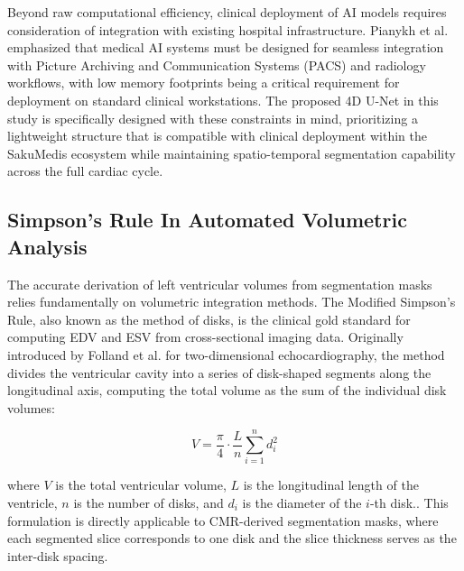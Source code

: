 \documentclass[final,3p,times,twocolumn]{elsarticle}
\begin{document}
Beyond raw computational efficiency, clinical deployment of AI models requires consideration of integration with existing hospital infrastructure. Pianykh et al. \cite{b26} emphasized that medical AI systems must be designed for seamless integration with Picture Archiving and Communication Systems (PACS) and radiology workflows, with low memory footprints being a critical requirement for deployment on standard clinical workstations. The proposed 4D U-Net in this study is specifically designed with these constraints in mind, prioritizing a lightweight structure that is compatible with clinical deployment within the SakuMedis ecosystem while maintaining spatio-temporal segmentation capability across the full cardiac cycle.

\subsection{Simpson's Rule In Automated Volumetric Analysis}
The accurate derivation of left ventricular volumes from segmentation masks relies fundamentally on volumetric integration methods. The Modified Simpson's Rule, also known as the method of disks, is the clinical gold standard for computing EDV and ESV from cross-sectional imaging data. Originally introduced by Folland et al. \cite{b27} for two-dimensional echocardiography, the method divides the ventricular cavity into a series of disk-shaped segments along the longitudinal axis, computing the total volume as the sum of the individual disk volumes:

\begin{equation}
    V = \frac{\pi}{4} \cdot \frac{L}{n} \sum_{i=1}^{n} d_i^2
    \label{eq:simpsons}
\end{equation}

\noindent where $V$ is the total ventricular volume, $L$ is the longitudinal length of the ventricle, $n$ is the number of disks, and $d_i$ is the diameter of the $i$-th disk.. This formulation is directly applicable to CMR-derived segmentation masks, where each segmented slice corresponds to one disk and the slice thickness serves as the inter-disk spacing.
\end{document}
